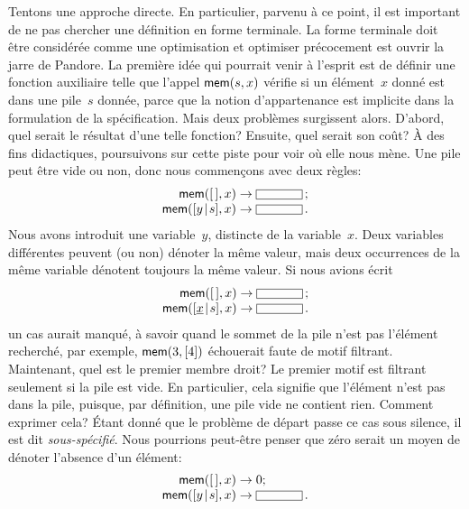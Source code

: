 Tentons une approche directe. En particulier, parvenu à ce point, il
est important de ne pas chercher une définition en forme terminale. La
forme terminale doit être considérée comme une optimisation et
optimiser précocement est ouvrir la jarre de Pandore.  La première
idée qui pourrait venir à l'esprit est de définir une fonction
auxiliaire  telle que l'appel \(\textsf{mem}(s,x)\) vérifie si
un élément~\(x\) donné est dans une pile~\(s\) donnée, parce que la
notion d'appartenance est implicite dans la formulation de la
spécification. Mais deux problèmes surgissent alors. D'abord, quel
serait le résultat d'une telle fonction? Ensuite, quel serait son
coût? À des fins didactiques, poursuivons sur cette piste pour voir où
elle nous mène. Une pile peut être vide ou non, donc nous commençons
avec deux règles:
\begin{equation*}
\begin{array}{r@{\;}c@{\;}l}
\fun{mem}(\el,x) & \rightarrow & \fbcode{CCCCC}\,;\\
\fun{mem}(\cons{y}{s},x) & \rightarrow & \fbcode{CCCCC}\,.
\end{array}
\end{equation*}
Nous avons introduit une variable~\(y\), distincte de la
variable~\(x\). Deux variables différentes peuvent (ou non) dénoter la
même valeur, mais deux occurrences de la même variable dénotent
toujours la même valeur. Si nous avions écrit
\begin{equation*}
\begin{array}{r@{\;}c@{\;}l}
\fun{mem}(\el,x) & \rightarrow & \fbcode{CCCCC}\,;\\
\fun{mem}(\cons{\underline{x}}{s},x) & \rightarrow & \fbcode{CCCCC}\,.
\end{array}
\end{equation*}
un cas aurait manqué, à savoir quand le sommet de la pile n'est pas
l'élément recherché, par exemple, \(\textsf{mem}(3,[4])\) échouerait
faute de motif filtrant. Maintenant, quel est le premier membre droit?
Le premier motif est filtrant seulement si la pile est vide. En
particulier, cela signifie que l'élément n'est pas dans la pile,
puisque, par définition, une pile vide ne contient rien. Comment
exprimer cela?  Étant donné que le problème de départ passe ce cas
sous silence, il est dit
\emph{sous-spécifié}. Nous pourrions
peut-être penser que zéro serait un moyen de dénoter l'absence d'un
élément:
\begin{equation*}
\begin{array}{r@{\;}c@{\;}l}
\fun{mem}(\el,x) & \rightarrow & 0;\\
\fun{mem}(\cons{y}{s},x) & \rightarrow & \fbcode{CCCCC}\,.
\end{array}
\end{equation*}

